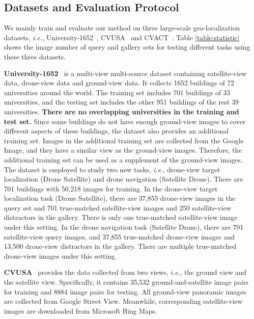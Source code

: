 \documentclass[journal]{IEEEtran}
\def\ie{\emph{i.e.}}
\begin{document}
\subsection{Datasets and Evaluation Protocol}
We mainly train and evaluate our method on three large-scale geo-localization datasets, \ie, University-1652~\cite{zheng_university-1652_nodate}, CVUSA~\cite{zhai_predicting_2017} and CVACT~\cite{liu_lending_2019}. Table \ref{table:statistic} shows the image number of query and gallery sets for testing different tasks using these three datasets.
\par
\textbf{University-1652}~\cite{zheng_university-1652_nodate} is a multi-view multi-source dataset containing satellite-view data, drone-view data and ground-view data. 
It collects 1652 buildings of 72 universities around the world. The training set includes 701 buildings of 33 universities, and the testing set includes the other 951 buildings of the rest 39 universities. \textbf{There are no overlapping universities in the training and test set.} Since some buildings do not have enough ground-view images to cover different aspects of these buildings, the dataset also provides an additional training set. Images in the additional training set are collected from the Google Image, and they have a similar view as the ground-view images. Therefore, the additional training set can be used as a supplement of the ground-view images. 
The dataset is employed to study two new tasks, \ie{}, drone-view target localization (Drone  Satellite) and drone navigation (Satellite  Drone). There are 701 buildings with 50,218 images for training. 
In the drone-view target localization task (Drone  Satellite), there are 37,855 drone-view images in the query set and 701 true-matched satellite-view images and 250 satellite-view distractors in the gallery. There is only one true-matched satellite-view image under this setting. In the drone navigation task (Satellite  Drone), there are 701 satellite-view query images, and 37,855 true-matched drone-view images and 13,500 drone-view distractors in the gallery. There are multiple true-matched drone-view images under this setting.
\par
\textbf{CVUSA}~\cite{zhai_predicting_2017} provides the data collected from two views, \ie, the ground view and the satellite view. Specifically, it contains 35,532 ground-and-satellite image pairs for training and 8884 image pairs for testing. All ground-view panoramic images are collected from Google Street View. Meanwhile, corresponding satellite-view images are downloaded from Microsoft Bing Maps. \par
\end{document}
